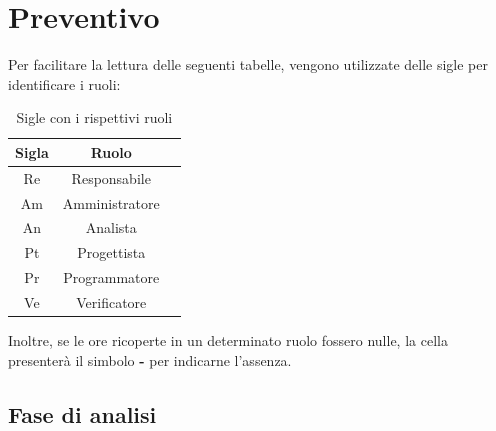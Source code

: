 \section{Preventivo}
Per facilitare la lettura delle seguenti tabelle, vengono utilizzate delle sigle 
per identificare i ruoli:

\begin{table}[H]
		\begin{center}
			\setlength{\aboverulesep}{0pt}
			\setlength{\belowrulesep}{0pt}
			\setlength{\extrarowheight}{.75ex}
			\begin{tabular}{ c c c }
				\rowcolor{AzzurroGruppo!30} 
				\textbf{Sigla} & \textbf{Ruolo} \\
				\toprule
				Re & Responsabile \\
				Am & Amministratore\\
				An & Analista\\
				Pt & Progettista\\
				Pr & Programmatore\\
				Ve & Verificatore\\
				\bottomrule
			\end{tabular}
			\caption{Sigle con i rispettivi ruoli}
		\end{center}
	\end{table}
\noindent
Inoltre, se le ore ricoperte in un determinato ruolo fossero nulle, la cella 
presenterà il simbolo \textbf{-} per indicarne l'assenza. 

\subsection{Fase di analisi}

